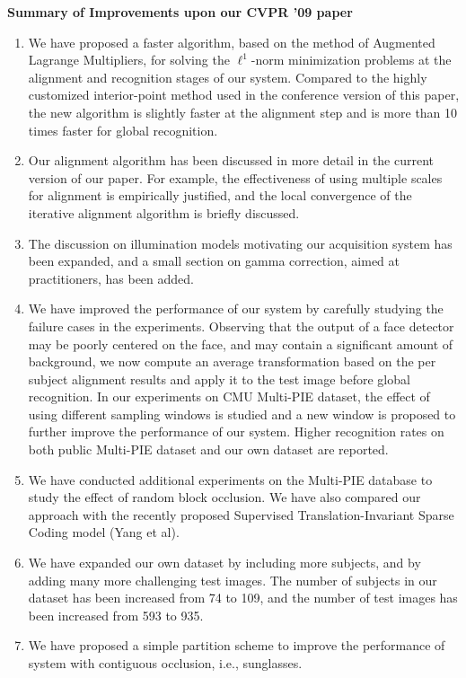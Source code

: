 \documentclass{article}
\begin{document}
\begin{center}
{\bf \large Summary of Improvements upon our CVPR '09 paper}
\end{center}

\begin{enumerate}

\item We have proposed a faster algorithm, based on the method of Augmented Lagrange Multipliers, for solving the $\ell^1$-norm minimization problems at the alignment and recognition stages of our system. Compared to the highly customized interior-point method used in the conference version of this paper, the new algorithm is slightly faster at the alignment step and is more than 10 times faster for global recognition.

\item Our alignment algorithm has been discussed in more detail in the current version of our paper. For example, the effectiveness of using multiple scales for alignment is empirically justified, and the local convergence of the iterative alignment algorithm is briefly discussed.

\item The discussion on illumination models motivating our acquisition system has been expanded, and a small section on gamma correction, aimed at practitioners, has been added.

\item We have improved the performance of our system by carefully studying the failure cases in the experiments. Observing that the output of a face detector may be poorly centered on the face, and may contain a significant amount of background, we now compute an average transformation based on the per subject alignment results and apply it to the test image before global recognition. In our experiments on CMU Multi-PIE dataset, the effect of using different sampling windows is studied and a new window is proposed to further improve the performance of our system. Higher recognition rates on both public Multi-PIE dataset and our own dataset are reported.

\item We have conducted additional experiments on the Multi-PIE database to study the effect of random block occlusion. We have also compared our approach with the recently proposed Supervised Translation-Invariant Sparse Coding model (Yang et al).

\item We have expanded our own dataset by including more subjects, and by adding many more challenging test images. The number of subjects in our dataset has been increased from 74 to 109, and the number of test images has been increased from 593 to 935.

\item We have proposed a simple partition scheme to improve the performance of system with contiguous occlusion, i.e., sunglasses.  

\end{enumerate}
\end{document}
